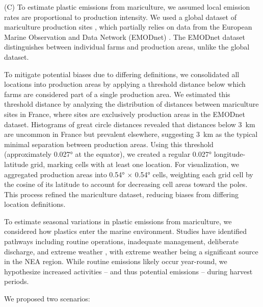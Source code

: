 (C) To estimate plastic emissions from mariculture, we assumed local emission rates are proportional to production intensity. We used a global dataset of mariculture production sites \cite{clawson_mapping_2022}, which partially relies on data from the European Marine Observation and Data Network (EMODnet) \cite{emodnet_emodnet_2014,emodnet_emodnet_2021}. The EMODnet dataset distinguishes between individual farms and production areas, unlike the global dataset. 

To mitigate potential biases due to differing definitions, we consolidated all locations into production areas by applying a threshold distance below which farms are considered part of a single production area. We estimated this threshold distance by analyzing the distribution of distances between mariculture sites in France, where sites are exclusively production areas in the EMODnet dataset. Histograms of great circle distances revealed that distances below \qty{3}{km} are uncommon in France but prevalent elsewhere, suggesting \qty{3}{km} as the typical minimal separation between production areas. Using this threshold (approximately \ang{0.027} at the equator), we created a regular \ang{0.027} longitude-latitude grid, marking cells with at least one location. For visualization, we aggregated production areas into \ang{0.54} $\times$ \ang{0.54} cells, weighting each grid cell by the cosine of its latitude to account for decreasing cell areas toward the poles. This process refined the mariculture dataset, reducing biases from differing location definitions. 

To estimate seasonal variations in plastic emissions from mariculture, we considered how plastics enter the marine environment. Studies have identified pathways including routine operations, inadequate management, deliberate discharge, and extreme weather \cite{skirtun_plastic_2022, tian_can_2022, global_ghost_gear_initiative_best_2021}, with extreme weather being a significant source in the NEA region. While routine emissions likely occur year-round, we hypothesize increased activities -- and thus potential emissions -- during harvest periods.

We proposed two scenarios:

